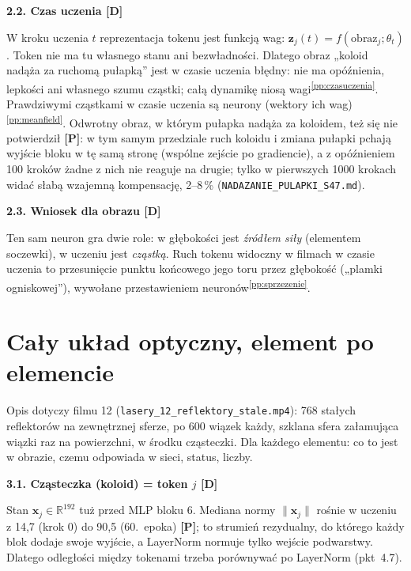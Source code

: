 \documentclass[a4paper,11pt]{article}
\newcommand{\stD}{\textcolor{dok}{\textsf{\textbf{[D]}}}}
\newcommand{\stP}{\textcolor{pom}{\textsf{\textbf{[P]}}}}
\newcommand{\pp}[1]{\textsuperscript{\ref{pp:#1}}}
\newcommand{\elem}[1]{\par\medskip\noindent\textbf{#1}\par\nopagebreak}
\begin{document}
\elem{2.2. Czas uczenia \stD}
W kroku uczenia $t$ reprezentacja tokenu jest funkcją wag: $\bm z_j(t)=f(\text{obraz}_j;\theta_t)$. Token nie ma tu własnego stanu ani
bezwładności. Dlatego obraz „koloid nadąża za ruchomą pułapką” jest w czasie uczenia błędny: nie ma opóźnienia, lepkości ani własnego
szumu cząstki; całą dynamikę niosą wagi\pp{czasuczenia}. Prawdziwymi cząstkami w czasie uczenia są neurony (wektory ich wag)\pp{meanfield}.
Odwrotny obraz, w którym pułapka nadąża za koloidem, też się nie potwierdził \stP: w tym samym przedziale ruch koloidu i zmiana pułapki
pchają wyjście bloku w tę samą stronę (wspólne zejście po gradiencie), a z opóźnieniem 100 kroków żadne z nich nie reaguje na drugie;
tylko w pierwszych 1000 krokach widać słabą wzajemną kompensację, 2--8\,\% (\texttt{NADAZANIE\_PULAPKI\_S47.md}).

\elem{2.3. Wniosek dla obrazu \stD}
Ten sam neuron gra dwie role: w głębokości jest \emph{źródłem siły} (elementem soczewki), w uczeniu jest \emph{cząstką}. Ruch tokenu
widoczny w filmach w czasie uczenia to przesunięcie punktu końcowego jego toru przez głębokość („plamki ogniskowej”), wywołane
przestawieniem neuronów\pp{sprzezenie}.

\section{Cały układ optyczny, element po elemencie}\label{sec:uklad}
Opis dotyczy filmu 12 (\texttt{lasery\_12\_reflektory\_stale.mp4}): 768 stałych reflektorów na zewnętrznej sferze, po 600 wiązek każdy,
szklana sfera załamująca wiązki raz na powierzchni, w środku cząsteczki. Dla każdego elementu: co to jest w obrazie, czemu odpowiada
w sieci, status, liczby.

\elem{3.1. Cząsteczka (koloid) = token $j$ \stD}
Stan $\bm x_j\in\mathbb R^{192}$ tuż przed MLP bloku 6. Mediana normy $\lVert\bm x_j\rVert$ rośnie w uczeniu z 14,7 (krok 0) do 90,5
(60.~epoka) \stP; to strumień rezydualny, do którego każdy blok dodaje swoje wyjście, a LayerNorm normuje tylko wejście podwarstwy.
Dlatego odległości między tokenami trzeba porównywać po LayerNorm (pkt~4.7).
\end{document}
